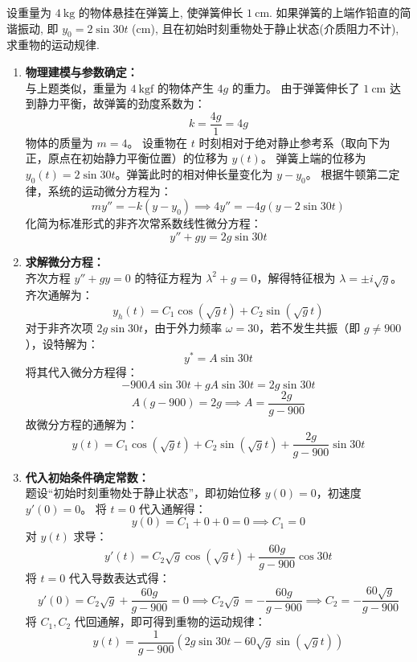 \documentclass[lang=cn,11pt]{elegantbook}
\begin{document}
\begin{exercise}
设重量为 $4\ \mathrm{kg}$ 的物体悬挂在弹簧上, 使弹簧伸长 $1\ \mathrm{cm}$. 如果弹簧的上端作铅直的简谐振动, 即 $y_0=2\sin 30t$ ($\mathrm{cm}$), 且在初始时刻重物处于静止状态(介质阻力不计), 求重物的运动规律.
\end{exercise}
\begin{solution}
\begin{enumerate}
    \item \textbf{物理建模与参数确定：}\\
    与上题类似，重量为 $4\ \mathrm{kgf}$ 的物体产生 $4g$ 的重力。
    由于弹簧伸长了 $1\ \mathrm{cm}$ 达到静力平衡，故弹簧的劲度系数为：
    \[
    k = \frac{4g}{1} = 4g
    \]
    物体的质量为 $m = 4$。
    设重物在 $t$ 时刻相对于绝对静止参考系（取向下为正，原点在初始静力平衡位置）的位移为 $y(t)$。
    弹簧上端的位移为 $y_0(t) = 2\sin 30t$。弹簧此时的相对伸长量变化为 $y - y_0$。
    根据牛顿第二定律，系统的运动微分方程为：
    \[
    m y'' = -k(y - y_0) \implies 4y'' = -4g(y - 2\sin 30t)
    \]
    化简为标准形式的非齐次常系数线性微分方程：
    \[
    y'' + gy = 2g\sin 30t
    \]

    \item \textbf{求解微分方程：}\\
    齐次方程 $y'' + gy = 0$ 的特征方程为 $\lambda^2 + g = 0$，解得特征根为 $\lambda = \pm i\sqrt{g}$。
    齐次通解为：
    \[
    y_h(t) = C_1\cos(\sqrt{g}t) + C_2\sin(\sqrt{g}t)
    \]
    对于非齐次项 $2g\sin 30t$，由于外力频率 $\omega = 30$，若不发生共振（即 $g \neq 900$），设特解为：
    \[
    y^* = A\sin 30t
    \]
    将其代入微分方程得：
    \[
    -900A\sin 30t + gA\sin 30t = 2g\sin 30t 
    \]
    \[
    A(g - 900) = 2g \implies A = \frac{2g}{g - 900}
    \]
    故微分方程的通解为：
    \[
    y(t) = C_1\cos(\sqrt{g}t) + C_2\sin(\sqrt{g}t) + \frac{2g}{g - 900}\sin 30t
    \]

    \item \textbf{代入初始条件确定常数：}\\
    题设“初始时刻重物处于静止状态”，即初始位移 $y(0) = 0$，初速度 $y'(0) = 0$。
    将 $t=0$ 代入通解得：
    \[
    y(0) = C_1 + 0 + 0 = 0 \implies C_1 = 0
    \]
    对 $y(t)$ 求导：
    \[
    y'(t) = C_2\sqrt{g}\cos(\sqrt{g}t) + \frac{60g}{g - 900}\cos 30t
    \]
    将 $t=0$ 代入导数表达式得：
    \[
    y'(0) = C_2\sqrt{g} + \frac{60g}{g - 900} = 0 \implies C_2\sqrt{g} = -\frac{60g}{g - 900} \implies C_2 = -\frac{60\sqrt{g}}{g - 900}
    \]
    将 $C_1, C_2$ 代回通解，即可得到重物的运动规律：
    \[
    \boxed{y(t) = \frac{1}{g - 900}\left(2g\sin 30t - 60\sqrt{g}\sin(\sqrt{g}t)\right)}
    \]
\end{enumerate}
\end{solution}
\end{document}
